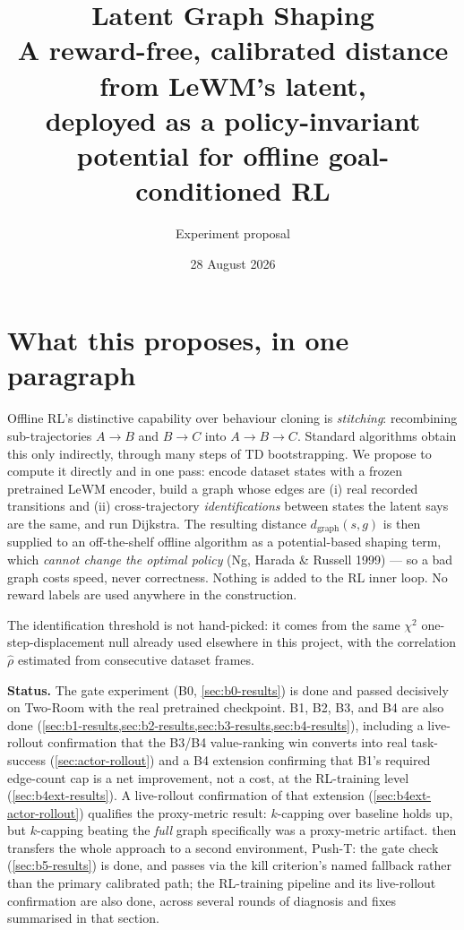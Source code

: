 \documentclass[11pt]{article}
\title{\vspace{-2em}\textbf{Latent Graph Shaping}\\[0.3em]
\large A reward-free, calibrated distance from LeWM's latent,\\
deployed as a policy-invariant potential for offline goal-conditioned RL}
\author{Experiment proposal}
\date{28 August 2026}
\newcommand{\dgraph}{d_{\mathrm{graph}}}
\begin{document}
\maketitle
\vspace{-1.5em}

\section{What this proposes, in one paragraph}

Offline RL's distinctive capability over behaviour cloning is \emph{stitching}: recombining
sub-trajectories $A\!\to\!B$ and $B\!\to\!C$ into $A\!\to\!B\!\to\!C$. Standard algorithms
obtain this only indirectly, through many steps of TD bootstrapping. We propose to compute it
directly and in one pass: encode dataset states with a frozen pretrained LeWM encoder, build a
graph whose edges are (i) real recorded transitions and (ii) cross-trajectory
\emph{identifications} between states the latent says are the same, and run Dijkstra. The
resulting distance $\dgraph(s,g)$ is then supplied to an off-the-shelf offline algorithm as a
potential-based shaping term, which \emph{cannot change the optimal policy} (Ng, Harada \&
Russell 1999) --- so a bad graph costs speed, never correctness. Nothing is added to the RL
inner loop. No reward labels are used anywhere in the construction.

The identification threshold is not hand-picked: it comes from the same $\chi^2$
one-step-displacement null already used elsewhere in this project, with the correlation
$\hat\rho$ estimated from consecutive dataset frames.

\textbf{Status.} The gate experiment (B0, \cref{sec:b0-results}) is done and passed decisively
on Two-Room with the real pretrained checkpoint. B1, B2, B3, and B4 are also done
(\cref{sec:b1-results,sec:b2-results,sec:b3-results,sec:b4-results}), including a live-rollout
confirmation that the B3/B4 value-ranking win converts into real task-success
(\cref{sec:actor-rollout}) and a B4 extension confirming that B1's required edge-count cap is a
net improvement, not a cost, at the RL-training level (\cref{sec:b4ext-results}). A live-rollout
confirmation of that extension (\cref{sec:b4ext-actor-rollout}) qualifies the proxy-metric result:
$k$-capping over baseline holds up, but $k$-capping beating the \emph{full} graph specifically was
a proxy-metric artifact.  then transfers the whole approach to a second
environment, Push-T: the gate check (\cref{sec:b5-results}) is done, and passes via the kill
criterion's named fallback rather than the primary calibrated path; the RL-training pipeline and
its live-rollout confirmation are also done, across several rounds of diagnosis and fixes
summarised in that section.
\end{document}
